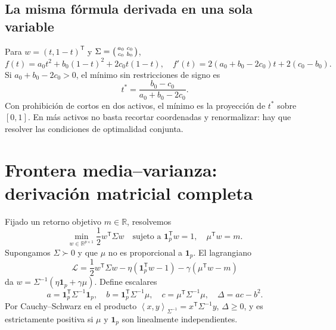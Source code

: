 \documentclass[11pt,a4paper]{article}
\newcommand{\R}{\mathbb R}
\newcommand{\T}{^{\mathsf T}}
\newcommand{\ip}[2]{\left\langle #1,#2\right\rangle}
\newcommand{\ones}{\mathbf 1}
\theoremstyle{definition}
\begin{document}
\subsection{La misma fórmula derivada en una sola variable}
Para $w=(t,1-t)\T$ y $\Sigma=\begin{psmallmatrix}a_0&c_0\\c_0&b_0\end{psmallmatrix}$,
\[
f(t)=a_0t^2+b_0(1-t)^2+2c_0t(1-t),\quad
f'(t)=2(a_0+b_0-2c_0)t+2(c_0-b_0).
\]
Si $a_0+b_0-2c_0>0$, el mínimo sin restricciones de signo es
\[
t^*=\frac{b_0-c_0}{a_0+b_0-2c_0}.
\]
Con prohibición de cortos en dos activos, el mínimo es la proyección de $t^*$ sobre $[0,1]$. En más activos no basta recortar coordenadas y renormalizar: hay que resolver las condiciones de optimalidad conjunta.

\section{Frontera media--varianza: derivación matricial completa}
Fijado un retorno objetivo $m\in\R$, resolvemos
\[
\min_{w\in\R^{p\times1}}\frac12w\T\Sigma w
\quad\text{sujeto a }\ones_p\T w=1,\quad\mu\T w=m.
\]
Supongamos $\Sigma\succ0$ y que $\mu$ no es proporcional a $\ones_p$. El lagrangiano
\[
\mathcal L=\frac12w\T\Sigma w-\eta(\ones_p\T w-1)-\gamma(\mu\T w-m)
\]
da $w=\Sigma^{-1}(\eta\ones_p+\gamma\mu)$. Define escalares
\[
a=\ones_p\T\Sigma^{-1}\ones_p,\quad
b=\ones_p\T\Sigma^{-1}\mu,\quad
c=\mu\T\Sigma^{-1}\mu,\quad\Delta=ac-b^2.
\]
Por Cauchy--Schwarz en el producto $\ip{x}{y}_{\Sigma^{-1}}=x\T\Sigma^{-1}y$, $\Delta\ge0$, y es estrictamente positiva si $\mu$ y $\ones_p$ son linealmente independientes.
\end{document}
